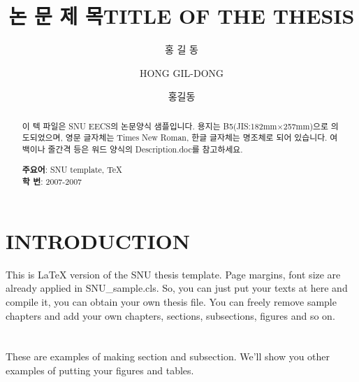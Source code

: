 \documentclass[master,korean]{snuee}
\title[korean]{논 문 제 목}
\title[english]{TITLE OF THE THESIS}
\author[korean]{홍 길 동}
\author[english]{HONG GIL-DONG}
\author[nospace]{홍길동}
\begin{document}
\renewcommand{\baselinestretch}{1.5}    %
\selectfont                             %

    \begin{abstract}
    \par %
    이 텍 파일은 SNU EECS의 논문양식 샘플입니다.
    용지는 B5(JIS:182mm$\times$257mm)으로 의도되었으며,
    영문 글자체는 Times New Roman, 한글 글자체는 명조체로 되어 있습니다.
    여백이나 줄간격 등은 워드 양식의 Description.doc를 참고하세요.

    \vfill
    \begin{minipage}[t][20mm][b]{\textwidth}
    {\bfseries 주요어}: SNU template, TeX\\
    {\bfseries 학 번}: 2007-2007\\
    \end{minipage}

    \end{abstract}

    \makelists   %


%
    \chapter{INTRODUCTION}
    This is LaTeX version of the SNU thesis template. Page margins, font size are already applied in SNU\_sample.cls.
    So, you can just put your texts at here and compile it, you can
    obtain your own thesis file.
    You can freely remove sample chapters and add your own chapters,
    sections, subsections, figures and so on.
    \\
    \\
    \\
    These are examples of making section and subsection.
    We'll show you other examples of putting your figures and
    tables.
\end{document}
